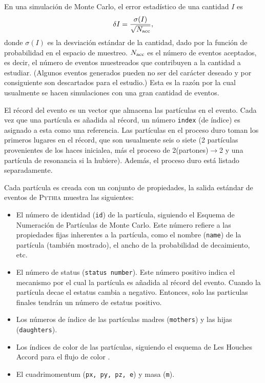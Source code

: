 \documentclass[a4paper,12pt]{article}
\begin{document}
En una simulación de Monte Carlo, el error estadístico de una cantidad $I$ es
$$
\delta I = \frac{\sigma (I)}{\sqrt {N_{\mathrm{acc}}}},
$$
donde $\sigma(I)$ es la desviación estándar de la cantidad, dado por la función de probabilidad en el espacio de muestreo. $N_{\mathrm{acc}}$ es el número de eventos aceptados, es decir, el número de eventos muestreados que contribuyen a la cantidad a estudiar. (Algunos eventos generados pueden no ser del carácter deseado y por consiguiente son descartados para el estudio.) Esta es la razón por la cual usualmente se hacen simulaciones con una gran cantidad de eventos.

El récord del evento es un vector que almacena las partículas en el evento. Cada vez que una partícula es añadida al récord, un número \verb|index| (de índice) es asignado a esta como una referencia. Las partículas en el proceso duro toman los primeros lugares en el récord, que son usualmente seis o siete (2 partículas provenientes de los haces inicialea, más el proceso de 2(partones)$\to$2 y una partícula de resonancia si la hubiere). Además, el proceso duro está listado separadamente.

Cada partícula es creada con un conjunto de propiedades, la salida estándar de eventos de \textsc{Pythia} muestra las siguientes:

\begin{itemize}
\item El número de identidad (\verb|id|) de la partícula, siguiendo el Esquema de Numeración de Partículas de Monte Carlo\cite{Beringer:1900zz}. Este número refiere a las propiedades fijas inherentes a la partícula, como el nombre (\verb|name|) de la partícula (también mostrado), el ancho de la probabilidad de decaimiento, etc.

\item El número de status (\verb|status number|). Este número positivo indica el mecanismo por el cual la partícula es añadida al récord del evento. Cuando la partícula decae el estatus cambia a negativo. Entonces, solo las particulas finales tendrán un número de estatus positivo.

\item Los números de índice de las partículas madres (\verb|mothers|) y las hijas (\verb|daughters|).

\item Los índices de color de las partículas, siguiendo el esquema de Les Houches Accord para el flujo de color \cite{Boos:2001cv}.

\item El cuadrimomentum (\verb|px, py, pz, e|) y masa (\verb|m|).
\end{itemize}
\end{document}
